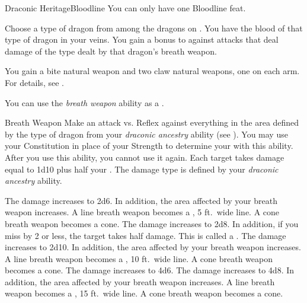     \begin{feat}{Draconic Heritage}{Bloodline}
         You can only have one Bloodline feat.

         Choose a type of dragon from among the dragons on .
        You have the blood of that type of dragon in your veins.
        You gain a  bonus to  against attacks that deal damage of the type dealt by that dragon's breath weapon.

         You gain a bite natural weapon and two claw natural weapons, one on each arm.
        For details, see .

         You can use the \textit{breath weapon} ability as a .
        \begin{freeability}{Breath Weapon}
            Make an attack vs. Reflex against everything in the area defined by the type of dragon from your \textit{draconic ancestry} ability (see ).
            You may use your Constitution in place of your Strength to determine your  with this ability.
            After you use this ability, you  cannot use it again.
            \hit Each target takes damage equal to 1d10 plus half your .
            The damage type is defined by your \textit{draconic ancestry} ability.

            \rankline
             The damage increases to 2d6.
                In addition, the area affected by your breath weapon increases.
                A line breath weapon becomes a \arealarge, 5 ft.\ wide line.
                A cone breath weapon becomes a \areamed cone.
             The damage increases to 2d8.
                In addition, if you miss by 2 or less, the target takes half damage.
                This is called a .
             The damage increases to 2d10.
                In addition, the area affected by your breath weapon increases.
                A line breath weapon becomes a \areahuge, 10 ft.\ wide line.
                A cone breath weapon becomes a \arealarge cone.
             The damage increases to 4d6.
             The damage increases to 4d8.
                In addition, the area affected by your breath weapon increases.
                A line breath weapon becomes a \areagarg, 15 ft.\ wide line.
                A cone breath weapon becomes a \areahuge cone.
        \end{freeability}


\end{feat}
